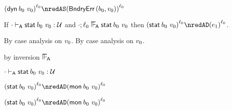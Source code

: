 {\begin{lamportproof*}
    \begin{pfproof}
      \qedstep
        \begin{pfproof}
          $\obars{\edynb{\sbnd_0}{\svalue_0}}{\sowner_0} \nredAS \obars{\boundaryerror{\sbnd_0}{\svalue_0}}{\sowner_0}$
        \end{pfproof}
    \end{pfproof}

\end{lamportproof*}}

\begin{lemma}\label{A-sta-label-progress}
  If\/ ${\cdot} \vdash_{\mathsf{A}} \mathsf{stat}^{}\,b_0~v_0 : {\mathcal U}$
  and\/ $\snil; \sowner_0 \sWLA \estab{\sbnd_0}{\svalue_0}$
  then\/ $\obars{\estab{\sbnd_0}{\svalue_0}}{\sowner_0} \nredAD \obars{\sexpr_1}{\sowner_0}$.
\end{lemma}{
  \newcommand{\shortproof}{By case analysis on $\svalue_0$.}
\begin{lamportproof*}
  \shortproof
\mainproof
  \shortproof

    \begin{pfproof}
      by inversion $\sWLA$
    \end{pfproof}

    \begin{pfproof}
      \absurdstep
        \begin{pfproof}
          ${\cdot} \vdash_{\mathsf{A}} \mathsf{stat}^{}\,b_0~v_0 : {\mathcal U}$
        \end{pfproof}
    \end{pfproof}

    \begin{pfproof}
      \qedstep
        \begin{pfproof}
          $\obars{\estab{\sbnd_0}{\svalue_0}}{\sowner_0} \nredAD \obars{\emon{\sbnd_0}{\svalue_0}}{\sowner_0}$
        \end{pfproof}
    \end{pfproof}

    \begin{pfproof}
      \qedstep
        \begin{pfproof}
          $\obars{\estab{\sbnd_0}{\svalue_0}}{\sowner_0} \nredAD \obars{\emon{\sbnd_0}{\svalue_0}}{\sowner_0}$
        \end{pfproof}
    \end{pfproof}


\end{lamportproof*}}
